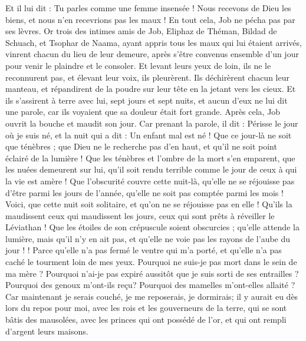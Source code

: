 \begin{multicols}{2}
Et il lui dit : Tu parles comme une femme insensée ! Nous recevons de Dieu les biens, et nous n'en recevrions pas les maux ! En tout cela, Job ne pécha pas par ses lèvres.
Or trois des intimes amis de Job, Eliphaz de Théman, Bildad de Schuach, et Tsophar de Naama, ayant appris tous les maux qui lui étaient arrivés, vinrent chacun du lieu de leur demeure, après s'être convenus ensemble d'un jour pour venir le plaindre et le consoler.
Et levant leurs yeux de loin, ils ne le reconnurent pas, et élevant leur voix, ils pleurèrent. Ils déchirèrent chacun leur manteau, et répandirent de la poudre sur leur tête en la jetant vers les cieux.
Et ils s'assirent à terre avec lui, sept jours et sept nuits, et aucun d'eux ne lui dit une parole, car ils voyaient que sa douleur était fort grande.
\VerseOne{}Après cela, Job ouvrit la bouche et maudit son jour.
Car prenant la parole, il dit :
Périsse le jour où je suis né, et la nuit qui a dit : Un enfant mal est né !
Que ce jour-là ne soit que ténèbres ; que Dieu ne le recherche pas d'en haut, et qu'il ne soit point éclairé de la lumière ! 
Que les ténèbres et l'ombre de la mort s'en emparent, que les nuées demeurent sur lui, qu'il soit rendu terrible comme le jour de ceux à qui la vie est amère ! 
Que l'obscurité couvre cette nuit-là, qu'elle ne se réjouisse pas d'être parmi les jours de l'année, qu'elle ne soit pas comptée parmi les mois !
Voici, que cette nuit soit solitaire, et qu'on ne se réjouisse pas en elle !
Qu'ils la maudissent ceux qui maudissent les jours, ceux qui sont prêts à réveiller le Léviathan !
Que les étoiles de son crépuscule soient obscurcies ; qu'elle attende la lumière, mais qu'il n'y en ait pas, et qu'elle ne voie pas les rayons de l'aube du jour !  !
Parce qu'elle n'a pas fermé le ventre qui m'a porté, et qu'elle n'a pas caché le tourment loin de mes yeux.
Pourquoi ne suis-je pas mort dans le sein de ma mère ? Pourquoi n'ai-je pas expiré aussitôt que je suis sorti de ses entrailles ?
Pourquoi des genoux m'ont-ils reçu? Pourquoi des mamelles m'ont-elles allaité ?
Car maintenant je serais couché, je me reposerais, je dormirais; il y aurait eu dès lors du repos pour moi,
avec les rois et les gouverneurs de la terre, qui se sont bâtis des mausolées,
avec les princes qui ont possédé de l'or, et qui ont rempli d'argent leurs maisons.

\end{multicols}
